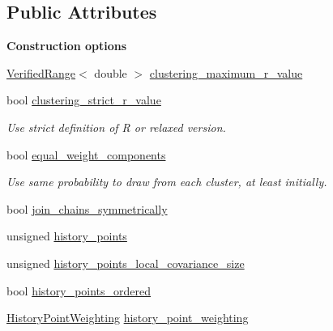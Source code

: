 \subsection*{Public Attributes}
\begin{Indent}{\bf Construction options}\par
{\em \label{_amgrpe7d736f6295bfb615e746cba52f7f946}
 }\begin{DoxyCompactItemize}
\item 
\hyperlink{classeos_1_1VerifiedRange}{VerifiedRange}$<$ double $>$ \hyperlink{structeos_1_1proposal__functions_1_1GlobalLocal_1_1Config_a6632462782aaefb7279fdb34f46d6d9c}{clustering\_\-maximum\_\-r\_\-value}
\item 
bool \hyperlink{structeos_1_1proposal__functions_1_1GlobalLocal_1_1Config_a9a530636287156e4ee98cb1ee2f04317}{clustering\_\-strict\_\-r\_\-value}
\begin{DoxyCompactList}\small\item\em Use strict definition of R or relaxed version. \item\end{DoxyCompactList}\item 
bool \hyperlink{structeos_1_1proposal__functions_1_1GlobalLocal_1_1Config_aafced70f6b662a177bdb7697cf107065}{equal\_\-weight\_\-components}
\begin{DoxyCompactList}\small\item\em Use same probability to draw from each cluster, at least initially. \item\end{DoxyCompactList}\item 
bool \hyperlink{structeos_1_1proposal__functions_1_1GlobalLocal_1_1Config_aecbd678a2838e79d850bb7aa732bb8cd}{join\_\-chains\_\-symmetrically}
\item 
unsigned \hyperlink{structeos_1_1proposal__functions_1_1GlobalLocal_1_1Config_a1ab33a4656cb4c0f4eed805b9394c221}{history\_\-points}
\item 
unsigned \hyperlink{structeos_1_1proposal__functions_1_1GlobalLocal_1_1Config_ac6b275330dd84325a42c3715d318551f}{history\_\-points\_\-local\_\-covariance\_\-size}
\item 
bool \hyperlink{structeos_1_1proposal__functions_1_1GlobalLocal_1_1Config_a74fc0b244166ec0fe894422ad254ca06}{history\_\-points\_\-ordered}
\item 
\hyperlink{structeos_1_1proposal__functions_1_1GlobalLocal_1_1Config_aeab1a700da2a313d2cdd5936752e34ce}{HistoryPointWeighting} \hyperlink{structeos_1_1proposal__functions_1_1GlobalLocal_1_1Config_a67a276c92681a1da8953365d058b2951}{history\_\-point\_\-weighting}

\end{DoxyCompactItemize}
\end{Indent}
